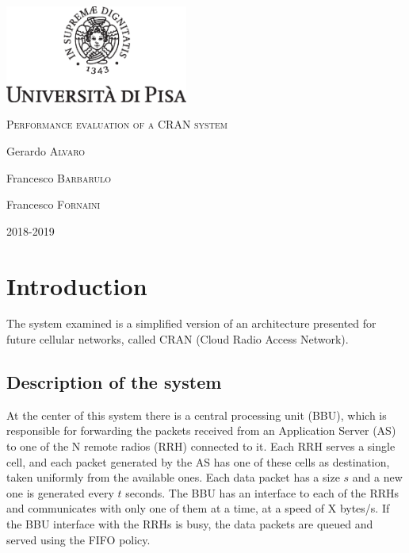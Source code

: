 \documentclass[11pt,a4paper,oneside, openright]{article}
\begin{document}
{
  \begin{titlepage}
  	\centering
  	\includegraphics[width=6cm]{images/unipi.eps}\par
  	\vspace{1.5cm}
  	{\huge\textsc{Performance evaluation of a CRAN system}\par}
  	\vspace{2cm}
  	Gerardo \textsc{Alvaro}\par
  	Francesco \textsc{Barbarulo}\par
    Francesco \textsc{Fornaini}

  	\vfill

  	{\large 2018-2019\par}
  \end{titlepage}
}


\tableofcontents

\newpage

\section{Introduction}
\label{sec:introduction}

The system examined is a simplified version of an architecture presented for future cellular networks, called CRAN (Cloud Radio Access Network).

\subsection{Description of the system}
 At the center of this system there is a central processing unit (BBU), which is responsible for forwarding the packets received from an Application Server (AS) to one of the N remote radios (RRH) connected to it. Each RRH serves a single cell, and each packet generated by the AS has one of these cells as destination, taken uniformly from the available ones. Each data packet has a size $s$ and a new one is generated every $t$ seconds. The BBU has an interface to each of the RRHs and communicates with only one of them at a time, at a speed of X bytes/s. If the BBU interface with the RRHs is busy, the data packets are queued and served using the FIFO policy. 
\end{document}
